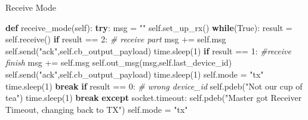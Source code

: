 \documentclass[ignorenonframetext,]{beamer}
\newenvironment{Shaded}{}{}
\newcommand{\CommentTok}[1]{\textcolor[rgb]{0.38,0.63,0.69}{\textit{#1}}}
\newcommand{\ControlFlowTok}[1]{\textcolor[rgb]{0.00,0.44,0.13}{\textbf{#1}}}
\newcommand{\DecValTok}[1]{\textcolor[rgb]{0.25,0.63,0.44}{#1}}
\newcommand{\KeywordTok}[1]{\textcolor[rgb]{0.00,0.44,0.13}{\textbf{#1}}}
\newcommand{\NormalTok}[1]{#1}
\newcommand{\OperatorTok}[1]{\textcolor[rgb]{0.40,0.40,0.40}{#1}}
\newcommand{\StringTok}[1]{\textcolor[rgb]{0.25,0.44,0.63}{#1}}
\newcommand{\VariableTok}[1]{\textcolor[rgb]{0.10,0.09,0.49}{#1}}
\begin{document}
\begin{frame}[fragile]{Receive Mode}
\protect\hypertarget{receive-mode}{}

\begin{Shaded}
\begin{Highlighting}[]

    \KeywordTok{def}\NormalTok{ receive_mode(}\VariableTok{self}\NormalTok{):}
        \ControlFlowTok{try}\NormalTok{:}
\NormalTok{            msg }\OperatorTok{=} \StringTok{""}
            \VariableTok{self}\NormalTok{.set_up_rx()}
            \ControlFlowTok{while}\NormalTok{(}\VariableTok{True}\NormalTok{):}
\NormalTok{                result }\OperatorTok{=} \VariableTok{self}\NormalTok{.receive()}
                \ControlFlowTok{if}\NormalTok{ result }\OperatorTok{==} \DecValTok{2}\NormalTok{: }\CommentTok{# receive part}
\NormalTok{                    msg }\OperatorTok{+=} \VariableTok{self}\NormalTok{.msg}
                    \VariableTok{self}\NormalTok{.send(}\StringTok{"ack"}\NormalTok{,}\VariableTok{self}\NormalTok{.cb_output_payload)}
\NormalTok{                    time.sleep(}\DecValTok{1}\NormalTok{)}
                \ControlFlowTok{if}\NormalTok{ result }\OperatorTok{==} \DecValTok{1}\NormalTok{: }\CommentTok{#receive finish}
\NormalTok{                    msg }\OperatorTok{+=} \VariableTok{self}\NormalTok{.msg}
                    \VariableTok{self}\NormalTok{.out_msg(msg,}\VariableTok{self}\NormalTok{.last_device_id)}
                    \VariableTok{self}\NormalTok{.send(}\StringTok{"ack"}\NormalTok{,}\VariableTok{self}\NormalTok{.cb_output_payload)}
\NormalTok{                    time.sleep(}\DecValTok{1}\NormalTok{)}
                    \VariableTok{self}\NormalTok{.mode }\OperatorTok{=} \StringTok{"tx"}
\NormalTok{                    time.sleep(}\DecValTok{1}\NormalTok{)}
                    \ControlFlowTok{break}
                \ControlFlowTok{if}\NormalTok{ result }\OperatorTok{==} \DecValTok{0}\NormalTok{: }\CommentTok{# wrong device_id}
                    \VariableTok{self}\NormalTok{.pdeb(}\StringTok{"Not our cup of tea"}\NormalTok{)}
\NormalTok{                    time.sleep(}\DecValTok{1}\NormalTok{)}
                    \ControlFlowTok{break}
        \ControlFlowTok{except}\NormalTok{ socket.timeout:}
            \VariableTok{self}\NormalTok{.pdeb(}\StringTok{"Master got Receiver Timeout, changing back to TX"}\NormalTok{)}
            \VariableTok{self}\NormalTok{.mode }\OperatorTok{=} \StringTok{"tx"}
\end{Highlighting}
\end{Shaded}

\end{frame}
\end{document}

